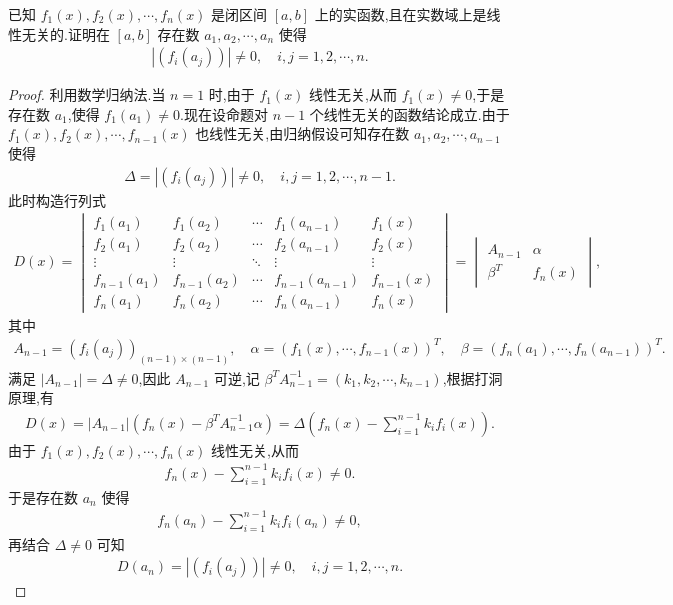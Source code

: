 \documentclass[../../main.tex]{subfiles}%
\begin{document}
\begin{example}
已知 $f_1(x), f_2(x), \cdots, f_n(x)$ 是闭区间 $[a, b]$ 上的实函数,且在实数域上是线性无关的.证明在 $[a, b]$ 存在数 $a_1, a_2, \cdots, a_n$ 使得
\begin{align*}
\left| (f_i(a_j)) \right| \neq 0, \quad i, j = 1, 2, \cdots, n.
\end{align*}
\end{example}
\begin{proof}
利用数学归纳法.当 $n = 1$ 时,由于 $f_1(x)$ 线性无关,从而 $f_1(x) \neq 0$,于是存在数 $a_1$,使得 $f_1(a_1) \neq 0$.现在设命题对 $n-1$ 个线性无关的函数结论成立.由于 $f_1(x), f_2(x), \cdots, f_{n-1}(x)$ 也线性无关,由归纳假设可知存在数 $a_1, a_2, \cdots, a_{n-1}$ 使得
\begin{align*}
\Delta = \left| (f_i(a_j)) \right| \neq 0, \quad i, j = 1, 2, \cdots, n-1.
\end{align*}
此时构造行列式
\begin{align*}
D(x) = 
\begin{vmatrix}
f_1(a_1) & f_1(a_2) & \cdots & f_1(a_{n-1}) & f_1(x) \\
f_2(a_1) & f_2(a_2) & \cdots & f_2(a_{n-1}) & f_2(x) \\
\vdots & \vdots & \ddots & \vdots & \vdots \\
f_{n-1}(a_1) & f_{n-1}(a_2) & \cdots & f_{n-1}(a_{n-1}) & f_{n-1}(x) \\
f_n(a_1) & f_n(a_2) & \cdots & f_n(a_{n-1}) & f_n(x)
\end{vmatrix}
= 
\begin{vmatrix}
A_{n-1} & \alpha \\
\beta^T & f_n(x)
\end{vmatrix},
\end{align*}
其中
\begin{align*}
A_{n-1} = (f_i(a_j))_{(n-1)\times(n-1)}, \quad 
\alpha = (f_1(x), \cdots, f_{n-1}(x))^T, \quad 
\beta = (f_n(a_1), \cdots, f_n(a_{n-1}))^T.
\end{align*}
满足 $|A_{n-1}| = \Delta \neq 0$,因此 $A_{n-1}$ 可逆,记 $\beta^T A_{n-1}^{-1} = (k_1, k_2, \cdots, k_{n-1})$,根据打洞原理,有
\begin{align*}
D(x) = |A_{n-1}| (f_n(x) - \beta^T A_{n-1}^{-1} \alpha) = \Delta \left( f_n(x) - \sum\limits_{i=1}^{n-1} k_i f_i(x) \right).
\end{align*}
由于 $f_1(x), f_2(x), \cdots, f_n(x)$ 线性无关,从而
\begin{align*}
f_n(x) - \sum\limits_{i=1}^{n-1} k_i f_i(x) \neq 0.
\end{align*}
于是存在数 $a_n$ 使得
\begin{align*}
f_n(a_n) - \sum\limits_{i=1}^{n-1} k_i f_i(a_n) \neq 0,
\end{align*}
再结合 $\Delta \neq 0$ 可知
\begin{align*}
D(a_n) = \left| (f_i(a_j)) \right| \neq 0, \quad i, j = 1, 2, \cdots, n.
\end{align*}
\end{proof}
\end{document}
